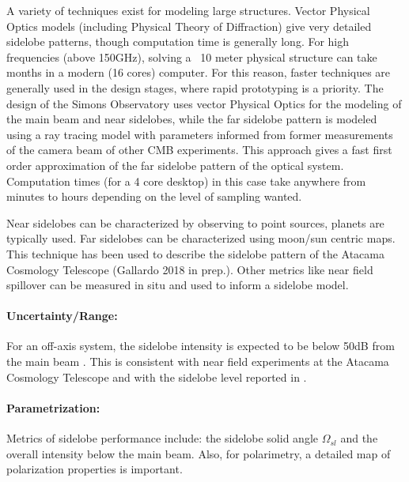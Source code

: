 A variety of techniques exist for modeling large structures. Vector Physical Optics models (including Physical Theory of Diffraction) give very detailed sidelobe patterns, though computation time is generally long. For high frequencies (above 150GHz), solving a ~10 meter physical structure can take months in a modern (16 cores) computer. For this reason, faster techniques are generally used in the design stages, where rapid prototyping is a priority. The design of the Simons Observatory uses vector Physical Optics for the modeling of the main beam and near sidelobes, while the far sidelobe pattern is modeled using a ray tracing model with parameters informed from former measurements of the camera beam of other CMB experiments. This approach gives a fast first order approximation of the far sidelobe pattern of the optical system. Computation times (for a 4 core desktop) in this case take anywhere from minutes to hours depending on the level of sampling wanted.

Near sidelobes can be characterized by observing to point sources, planets are typically used. Far sidelobes can be characterized using moon/sun centric maps. This technique has been used to describe the sidelobe pattern of the Atacama Cosmology Telescope (Gallardo 2018 in prep.). Other metrics like near field spillover can be measured in situ and used to inform a sidelobe model.

\paragraph{Uncertainty/Range:}
For an off-axis system, the sidelobe intensity is expected to be below 50dB from the main beam \cite{lockman_stray_2002}. This is consistent with near field experiments at the Atacama Cosmology Telescope \cite{dunner_far_2012} and with the sidelobe level reported in \cite{naess_atacama_2014}.


\paragraph{Parametrization:} Metrics of sidelobe performance include: the sidelobe solid angle $\Omega_{sl}$ and the overall intensity below the main beam. Also, for polarimetry, a detailed map of polarization properties is important.


